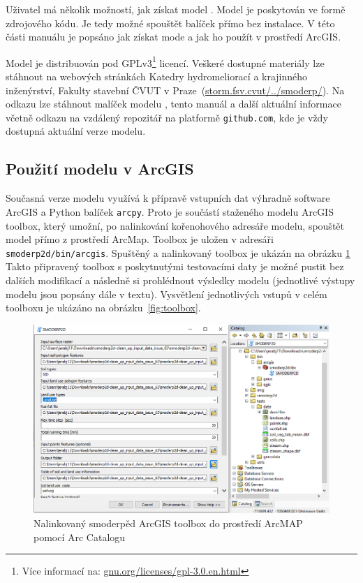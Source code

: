 Uživatel má několik možností, jak získat model \smod. 
Model \smod je poskytován ve formě zdrojového kódu. Je tedy možné spouštět 
balíček přímo bez instalace. V této části manuálu je popsáno jak získat mode \smod a jak ho použít
v prostředí ArcGIS.
  
Model \smod je distribuován pod GPLv3\footnote{Více informací na: 
\href{https://www.gnu.org/licenses/gpl-3.0.en.html}{gnu.org/licenses/gpl-3.0.en.html}} licencí. 
Veškeré dostupné  materiály lze stáhnout na webových stránkách Katedry hydromeliorací 
a krajinného inženýrství, Fakulty stavební ČVUT 
v Praze~(\href{http://storm.fsv.cvut.cz/cinnost-katedry/volne-stazitelne-vysledky/smoderp/}{storm.fsv.cvut/../smoderp/}). 
Na odkazu lze stáhnout malíček modelu \smod, tento manuál a další aktuální informace včetně odkazu na vzdálený 
repozitář na platformě {\tt github.com}, kde je vždy dostupná aktuální verze modelu. 


\subsection{Použití modelu v ArcGIS}
  
Současná verze modelu \smod využívá k přípravě vstupních dat výhradně software ArcGIS a Python balíček {\tt arcpy}. 
Proto je součástí staženého modelu ArcGIS toolbox, který umožní, po nalinkování kořenohového adresáře modelu, 
spouštět model \smod přímo z prostředí ArcMap. Toolbox je uložen v adresáři {\tt smoderp2d/bin/arcgis}.
Spuštěný a nalinkovaný toolbox je ukázán na obrázku \ref{fig:toolboxlink}
Takto připravený toolbox s poskytnutými testovacími daty je možné pustit bez dalších modifikací a následně si prohlédnout 
výsledky modelu (jednotlivé výstupy modelu jsou popsány dále v textu). Vysvětlení jednotlivých vstupů v celém toolboxu je ukázáno na obrázku~\ref{fig:toolbox}.


 \begin{figure}[t!]
    \centering
    \includegraphics[width=1.0\textwidth]{./img/arcmap01.png}
     \caption{Nalinkovaný smoderpěd ArcGIS toolbox do prostředí ArcMAP pomocí Arc Catalogu}
    \label{fig:toolboxlink}
  \end{figure}

